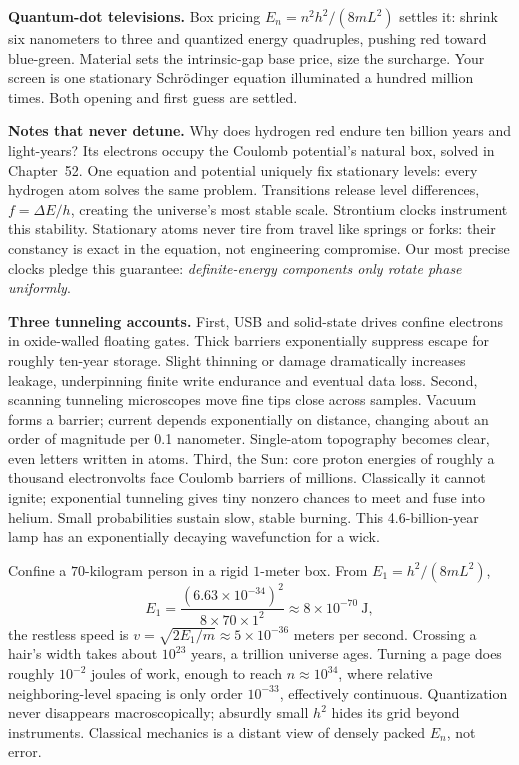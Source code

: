 
\textbf{Quantum-dot televisions.} Box pricing \(E_{n}=n^{2}h^{2}/(8mL^{2})\) settles it: shrink six nanometers to three and quantized energy quadruples, pushing red toward blue-green. Material sets the intrinsic-gap base price, size the surcharge. Your screen is one stationary Schrödinger equation illuminated a hundred million times. Both opening and first guess are settled.

\textbf{Notes that never detune.} Why does hydrogen red endure ten billion years and light-years? Its electrons occupy the Coulomb potential's natural box, solved in Chapter~52. One equation and potential uniquely fix stationary levels: every hydrogen atom solves the same problem. Transitions release level differences, \(f=\Delta E/h\), creating the universe's most stable scale. Strontium clocks instrument this stability. Stationary atoms never tire from travel like springs or forks: their constancy is exact in the equation, not engineering compromise. Our most precise clocks pledge this guarantee: \emph{definite-energy components only rotate phase uniformly}.

\textbf{Three tunneling accounts.} First, USB and solid-state drives confine electrons in oxide-walled floating gates. Thick barriers exponentially suppress escape for roughly ten-year storage. Slight thinning or damage dramatically increases leakage, underpinning finite write endurance and eventual data loss. Second, scanning tunneling microscopes move fine tips close across samples. Vacuum forms a barrier; current depends exponentially on distance, changing about an order of magnitude per 0.1 nanometer. Single-atom topography becomes clear, even letters written in atoms. Third, the Sun: core proton energies of roughly a thousand electronvolts face Coulomb barriers of millions. Classically it cannot ignite; exponential tunneling gives tiny nonzero chances to meet and fuse into helium. Small probabilities sustain slow, stable burning. This 4.6-billion-year lamp has an exponentially decaying wavefunction for a wick.


\begin{thought}
Confine a \(70\)-kilogram person in a rigid \(1\)-meter box. From \(E_{1}=h^{2}/(8mL^{2})\),
\[
  E_{1}=\frac{(6.63\times10^{-34})^{2}}{8\times70\times1^{2}}\approx8\times10^{-70}\ \text{J},
\]
the restless speed is \(v=\sqrt{2E_{1}/m}\approx5\times10^{-36}\) meters per second. Crossing a hair's width takes about \(10^{23}\) years, a trillion universe ages. Turning a page does roughly \(10^{-2}\) joules of work, enough to reach \(n\approx10^{34}\), where relative neighboring-level spacing is only order \(10^{-33}\), effectively continuous. Quantization never disappears macroscopically; absurdly small \(h^{2}\) hides its grid beyond instruments. Classical mechanics is a distant view of densely packed \(E_{n}\), not error.
\end{thought}

